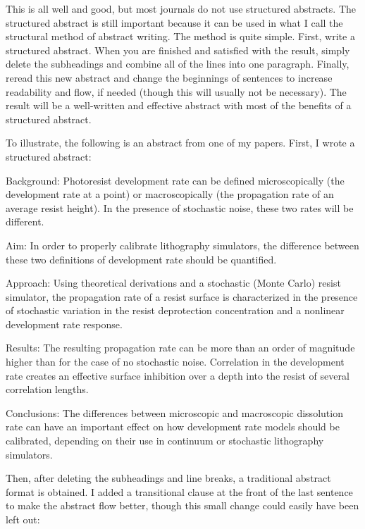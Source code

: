 This is all well and good, but most journals do not use structured abstracts. The structured abstract is still important because it can be used in what I call the structural method of abstract writing. The method is quite simple. First, write a structured abstract. When you are finished and satisfied with the result, simply delete the subheadings and combine all of the lines into one paragraph. Finally, reread this new abstract and change the beginnings of sentences to increase readability and flow, if needed (though this will usually not be necessary). The result will be a well-written and effective abstract with most of the benefits of a structured abstract.

To illustrate, the following is an abstract from one of my papers. First, I wrote a structured abstract:

Background: Photoresist development rate can be defined microscopically (the development rate at a point) or macroscopically (the propagation rate of an average resist height). In the presence of stochastic noise, these two rates will be different.

Aim: In order to properly calibrate lithography simulators, the difference between these two definitions of development rate should be quantified.

Approach: Using theoretical derivations and a stochastic (Monte Carlo) resist simulator, the propagation rate of a resist surface is characterized in the presence of stochastic variation in the resist deprotection concentration and a nonlinear development rate response.

Results: The resulting propagation rate can be more than an order of magnitude higher than for the case of no stochastic noise. Correlation in the development rate creates an effective surface inhibition over a depth into the resist of several correlation lengths.

Conclusions: The differences between microscopic and macroscopic dissolution rate can have an important effect on how development rate models should be calibrated, depending on their use in continuum or stochastic lithography simulators.

Then, after deleting the subheadings and line breaks, a traditional abstract format is obtained. I added a transitional clause at the front of the last sentence to make the abstract flow better, though this small change could easily have been left out:

